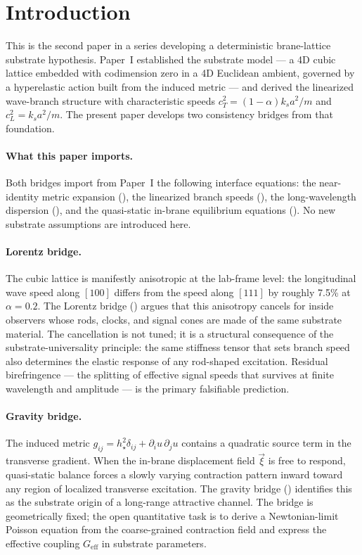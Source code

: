 \section{Introduction}
\label{sec:introduction}

This is the second paper in a series developing a deterministic brane-lattice substrate hypothesis.
Paper~I established the substrate model --- a 4D cubic lattice embedded with codimension zero in a
4D Euclidean ambient, governed by a hyperelastic action built from the induced metric --- and derived
the linearized wave-branch structure with characteristic speeds
$c_T^2=(1-\alpha)k_s a^2/m$ and $c_L^2=k_s a^2/m$.
The present paper develops two consistency bridges from that foundation.

\paragraph{What this paper imports.}
Both bridges import from Paper~I the following interface equations:
the near-identity metric expansion (),
the linearized branch speeds (),
the long-wavelength dispersion (),
and the quasi-static in-brane equilibrium equations ().
No new substrate assumptions are introduced here.

\paragraph{Lorentz bridge.}
The cubic lattice is manifestly anisotropic at the lab-frame level: the longitudinal wave speed
along $[100]$ differs from the speed along $[111]$ by roughly 7.5\% at $\alpha=0.2$.
The Lorentz bridge () argues that this anisotropy cancels for inside observers
whose rods, clocks, and signal cones are made of the same substrate material.
The cancellation is not tuned; it is a structural consequence of the substrate-universality
principle: the same stiffness tensor that sets branch speed also determines the elastic response
of any rod-shaped excitation.
Residual birefringence --- the splitting of effective signal speeds that survives at finite
wavelength and amplitude --- is the primary falsifiable prediction.

\paragraph{Gravity bridge.}
The induced metric $g_{ij} = h_\star^2\delta_{ij} + \partial_i u\,\partial_j u$ contains a
quadratic source term in the transverse gradient.
When the in-brane displacement field $\vec\xi$ is free to respond, quasi-static balance forces
a slowly varying contraction pattern inward toward any region of localized transverse excitation.
The gravity bridge () identifies this as the substrate origin of a long-range
attractive channel.
The bridge is geometrically fixed; the open quantitative task is to derive a Newtonian-limit
Poisson equation from the coarse-grained contraction field and express the effective coupling
$G_{\text{eff}}$ in substrate parameters.

